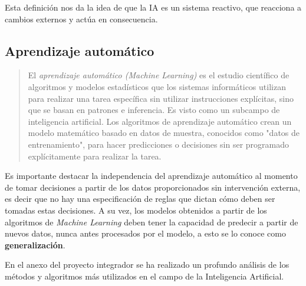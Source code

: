 \documentclass[a4paper,12pt]{article}
\begin{document}
Esta definición nos da la idea de que la IA es un sistema reactivo, que reacciona a cambios externos y actúa en consecuencia.

\subsection{Aprendizaje automático} \label{machinelearning}

\begin{quote}
	El \textit{aprendizaje automático (Machine Learning)} es el estudio científico de algoritmos y modelos estadísticos que los sistemas informáticos utilizan para realizar una tarea específica sin utilizar instrucciones explícitas, sino que se basan en patrones e inferencia. Es visto como un subcampo de inteligencia artificial. Los algoritmos de aprendizaje automático crean un modelo matemático basado en datos de muestra, conocidos como "datos de entrenamiento", para hacer predicciones o decisiones sin ser programado explícitamente para realizar la tarea.
	  
	\hfill \citet{bishop2006pattern}
\end{quote}

Es importante destacar la independencia del aprendizaje automático al momento de tomar decisiones a partir de los datos proporcionados sin intervención externa, es decir que no hay una especificación de reglas que dictan cómo deben ser tomadas estas decisiones. A su vez, los modelos obtenidos a partir de los algoritmos de \textit{Machine Learning} deben tener la capacidad de predecir a partir de nuevos datos, nunca antes procesados por el modelo, a esto se lo conoce como \textbf{generalización}. 

En el anexo del proyecto integrador se ha realizado un profundo análisis de los métodos y algoritmos más utilizados en el campo de la Inteligencia Artificial.
%
%
%
		
\end{document}
